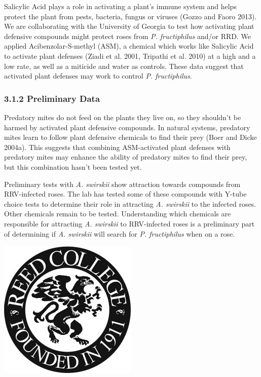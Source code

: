 \documentclass[12pt,final,CPage]{ufthesis}
\begin{document}
{  Salicylic Acid plays a role in activating a plant's immune system and helps protect the plant from pests, bacteria, fungus or viruses (Gozzo and Faoro 2013). We are collaborating with the University of Georgia to test how activating plant defensive compounds might protect roses from \emph{P. fructiphilus} and/or RRD. We applied Acibenzolar-S-methyl (ASM), a chemical which works like Salicylic Acid to activate plant defenses (Ziadi et al. 2001, Tripathi et al. 2010) at a high and a low rate, as well as a miticide and water as controls. These data suggest that activated plant defenses may work to control \emph{P. fructiphilus}.

  \hypertarget{preliminary-data}{%
  \subsubsection{3.1.2 Preliminary Data}\label{preliminary-data}}

  Predatory mites do not feed on the plants they live on, so they shouldn't be harmed by activated plant defensive compounds. In natural systems, predatory mites learn to follow plant defensive chemicals to find their prey (Boer and Dicke 2004a). This suggests that combining ASM-activated plant defenses with predatory mites may enhance the ability of predatory mites to find their prey, but this combination hasn't been tested yet.

  Preliminary tests with \emph{A. swirskii} show attraction towards compounds from RRV-infected roses. The lab has tested some of these compounds with Y-tube choice tests to determine their role in attracting \emph{A. swirskii} to the infected roses. Other chemicals remain to be tested. Understanding which chemicals are responsible for attracting \emph{A. swirskii} to RRV-infected roses is a preliminary part of determining if \emph{A. swirskii} will search for \emph{P. fructiphilus} when on a rose.
  \begin{center}\includegraphics[width=0.8\linewidth]{figure/reed} \end{center}

}
\end{document}
